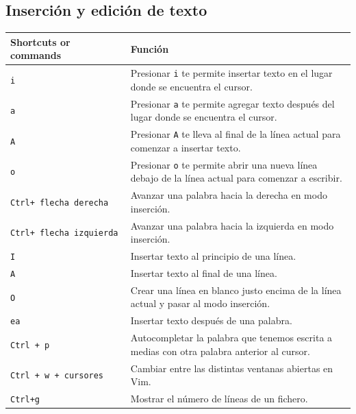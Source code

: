 \documentclass[
  doc,
  floatsintext,
  longtable,
  a4paper,
  nolmodern,
  notxfonts,
  notimes,
  12pt,
  colorlinks=true,linkcolor=blue,citecolor=blue,urlcolor=blue]{apa7}
\newcounter{none} %
\begin{document}
\subsection{Inserción y edición de
texto}\label{inserciuxf3n-y-ediciuxf3n-de-texto}

{\def\LTcaptype{none} %
\begin{longtable}[]{@{}
  >{\raggedright\arraybackslash}p{}
  >{\raggedright\arraybackslash}p{}@{}}
\toprule\noalign{}
\begin{minipage}[b]{\linewidth}\raggedright
Shortcuts or commands
\end{minipage} & \begin{minipage}[b]{\linewidth}\raggedright
Función
\end{minipage} \\
\midrule\noalign{}
\endhead
\bottomrule\noalign{}
\endlastfoot
\texttt{i} & Presionar \texttt{i} te permite insertar texto en el lugar
donde se encuentra el cursor. \\
\texttt{a} & Presionar \texttt{a} te permite agregar texto después del
lugar donde se encuentra el cursor. \\
\texttt{A} & Presionar \texttt{A} te lleva al final de la línea actual
para comenzar a insertar texto. \\
\texttt{o} & Presionar \texttt{o} te permite abrir una nueva línea
debajo de la línea actual para comenzar a escribir. \\
\texttt{Ctrl+\ flecha\ derecha} & Avanzar una palabra hacia la derecha
en modo inserción. \\
\texttt{Ctrl+\ flecha\ izquierda} & Avanzar una palabra hacia la
izquierda en modo inserción. \\
\texttt{I} & Insertar texto al principio de una línea. \\
\texttt{A} & Insertar texto al final de una línea. \\
\texttt{O} & Crear una línea en blanco justo encima de la línea actual y
pasar al modo inserción. \\
\texttt{ea} & Insertar texto después de una palabra. \\
\texttt{Ctrl\ +\ p} & Autocompletar la palabra que tenemos escrita a
medias con otra palabra anterior al cursor. \\
\texttt{Ctrl\ +\ w\ +\ cursores} & Cambiar entre las distintas ventanas
abiertas en Vim. \\
\texttt{Ctrl+g} & Mostrar el número de líneas de un fichero. \\
\end{longtable}
}
\end{document}
